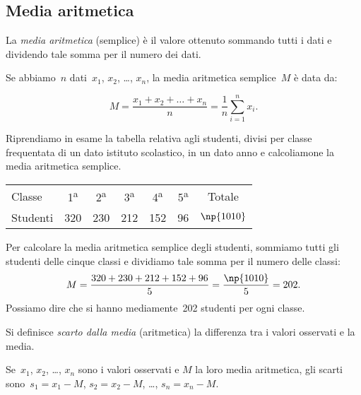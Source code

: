 \subsection{Media aritmetica}

\begin{definizione}
La \emph{media aritmetica} (semplice) è il valore ottenuto sommando tutti i dati e
dividendo tale somma per il numero dei dati.
\end{definizione}

Se abbiamo~$n$ dati~$x_1$, $x_2$, \ldots, $x_n$, la media aritmetica semplice~$M$ è data da:

\begin{equation*}
M=\frac{x_1+x_2+ \dots +x_n}{n}=\frac{1}{n}\sum_{i=1}^n x_i.
\end{equation*}

\begin{exrig}
 \begin{esempio}

Riprendiamo in esame la tabella relativa agli studenti, divisi per classe frequentata di un dato istituto scolastico, in un dato anno e calcoliamone la media aritmetica semplice.
\begin{center}
 \begin{tabular}{lcccccc}
 \toprule
 Classe & 1\textsuperscript{a} & 2\textsuperscript{a} & 3\textsuperscript{a} & 4\textsuperscript{a} & 5\textsuperscript{a} & Totale\\
 Studenti & 320 & 230 & 212 & 152 & 96 & $\np{1010}$\\
 \bottomrule
\end{tabular}
\end{center}
Per calcolare la media aritmetica semplice degli studenti, sommiamo tutti gli studenti delle cinque classi e dividiamo tale somma per il numero delle classi:
\begin{equation*}
M=\frac{320+230+212+152+96}{5}= \frac{\np{1010}}{5}= 202.
\end{equation*}
Possiamo dire che si hanno mediamente~202 studenti per ogni classe.
 \end{esempio}
\end{exrig}

\begin{definizione}
Si definisce \emph{scarto dalla media} (aritmetica) la differenza tra i valori osservati e la media.
\end{definizione}

Se~$x_1$, $x_2$, \ldots, $x_n$ sono i valori osservati e $M$ la loro media aritmetica, gli scarti sono~$s_1=x_1-M$, $s_2=x_2-M$, \ldots, $s_n=x_n-M$.

